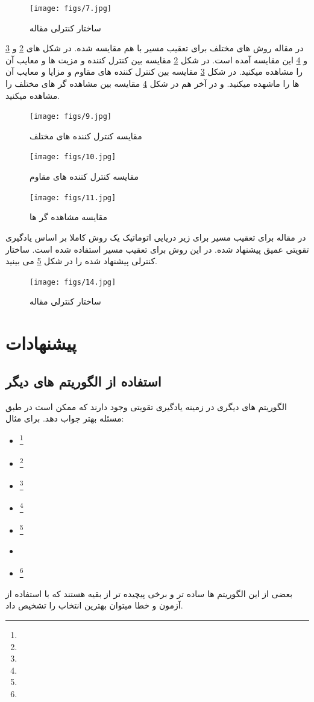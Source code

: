 \documentclass[12pt,a4paper]{report}
\begin{document}
	\begin{figure}
		\texttt{[image: figs/7.jpg]}
		\caption{ساختار کنترلی مقاله \cite{wang2019path}}
		\label{fig:fuzzy_mpc}
	\end{figure}
	
	در مقاله \cite{yao2020control} روش های مختلف برای تعقیب مسیر با هم مقایسه شده. در شکل های \ref{fig:diff1} و \ref{fig:diff2} و \ref{fig:diff3} این مقایسه آمده است. در شکل \ref{fig:diff1} مقایسه بین کنترل کننده و مزیت ها و معایب آن را مشاهده میکنید. در شکل  \ref{fig:diff2} مقایسه بین کنترل کننده های مقاوم و مزایا و معایب آن ها را ماشهده میکنید. و در آخر هم در شکل \ref{fig:diff3} مقایسه بین مشاهده گر های مختلف را مشاهده میکنید.\\
	\begin{figure}
		\texttt{[image: figs/9.jpg]}
		\caption{مقایسه کنترل کننده های مختلف}
		\label{fig:diff1}
	\end{figure}
	\begin{figure}
		\texttt{[image: figs/10.jpg]}
		\caption{مقایسه کنترل کننده های مقاوم}
		\label{fig:diff2}
	\end{figure}
	\begin{figure}
		\texttt{[image: figs/11.jpg]}
		\caption{مقایسه مشاهده گر ها}
		\label{fig:diff3}
	\end{figure}
	
	در مقاله \cite{fang2022auv} برای تعقیب مسیر برای زیر دریایی اتوماتیک یک روش کاملا بر اساس یادگیری تقویتی عمیق پیشنهاد شده. در این روش  برای تعقیب مسیر استفاده شده است. ساختار کنترلی پیشنهاد شده را در شکل \ref{fig:auv} می بینید.
	\begin{figure}
		\texttt{[image: figs/14.jpg]}
		\caption{ساختار کنترلی مقاله \cite{fang2022auv}}
		\label{fig:auv}
	\end{figure}
	
	\chapter{پیشنهادات}
	\section*{استفاده از الگوریتم های دیگر}
	الگوریتم های دیگری در زمینه یادگیری تقویتی وجود دارند که ممکن است در طبق مسئله بهتر جواب دهد. برای مثال:
	\begin{itemize}
		\item[\ding{70}]  \footnote{}
		\item[\ding{70}]  \footnote{}
		\item[\ding{70}]  \footnote{}
		\item[\ding{70}]  \footnote{}
		\item[\ding{70}]  \footnote{}
		\item[\ding{70}] 
		\item[\ding{70}]  \footnote{}
	\end{itemize}
	بعضی از این الگوریتم ها ساده تر و برخی پیچیده تر از بقیه هستند که با استفاده از آزمون و خطا میتوان بهترین انتخاب را تشخیص داد.
\end{document}
